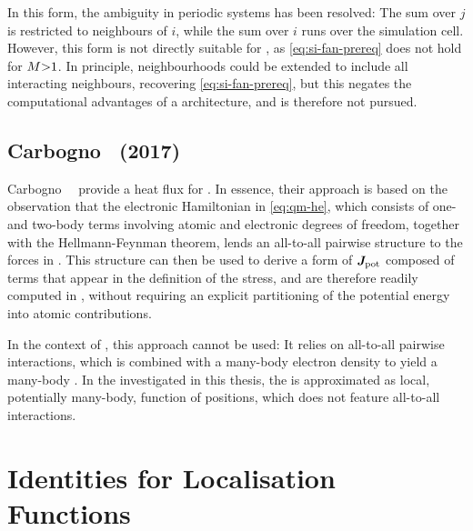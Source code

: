 In this form, the ambiguity in periodic systems has been resolved: The sum over $j$ is restricted to neighbours of $i$, while the sum over $i$ runs over the simulation cell. However, this form is not directly suitable for \glps, as \cref{eq:si-fan-prereq} does not hold for $M{>}1$. In principle, neighbourhoods could be extended to include all interacting neighbours, recovering \cref{eq:si-fan-prereq}, but this negates the computational advantages of a \glp architecture, and is therefore not pursued.

\subsection{Carbogno~\etal{} (2017)}

Carbogno~\etal{}~\cite{crs2017t} provide a heat flux for \dft. In essence, their approach is based on the observation that the electronic Hamiltonian in \cref{eq:qm-he}, which consists of one- and two-body terms involving atomic and electronic degrees of freedom, together with the Hellmann-Feynman theorem, lends an all-to-all pairwise structure to the forces in \dft. This structure can then be used to derive a form of $\boldsymbol{J}_\text{pot}$ composed of terms that appear in the definition of the stress, and are therefore readily computed in \dft, without requiring an explicit partitioning of the potential energy into atomic contributions.

In the context of \glps, this approach cannot be used: It relies on all-to-all pairwise interactions, which is combined with a many-body electron density to yield a many-body \pes. In the \mlps investigated in this thesis, the \pes is approximated as local, potentially many-body, function of positions, which does not feature all-to-all interactions.


\section{Identities for Localisation Functions}
\label{sec:si-hf_identities}

